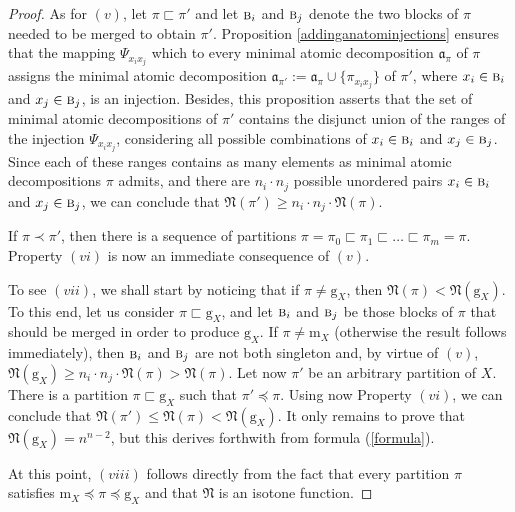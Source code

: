 \documentclass[12pt]{extarticle}
\begin{document}
\begin{proof}
		As for $(v)$, let $\pi \sqsubset \pi'$ and let $\textsc{b}_i$ and $\textsc{b}_j$ denote the two blocks of $\pi$ needed to be merged to obtain $\pi'$. Proposition \ref{addinganatominjections} ensures that the mapping $\Psi_{x_ix_j}$ which to every minimal atomic decomposition $\mathfrak{a}_{\pi}$ of $\pi$ assigns the minimal atomic decomposition $\mathfrak{a}_{\pi'}:=\mathfrak{a}_{\pi}\cup \{\pi_{x_ix_j}\}$ of $\pi'$, where $x_i\in \textsc{b}_i$ and $x_j\in \textsc{b}_j$, is an injection. Besides, this proposition asserts that the set of minimal atomic decompositions of $\pi'$ contains the disjunct union of the ranges of the injection $\Psi_{x_ix_j}$, considering all possible combinations of $x_i\in \textsc{b}_i$ and $x_j\in \textsc{b}_j$.  Since each of these ranges contains as many elements as minimal atomic decompositions $\pi$ admits, and there are $n_i\cdot n_j$ possible unordered pairs $x_i\in \textsc{b}_i$ and $x_j\in \textsc{b}_j$, we can conclude that $\mathfrak{N}(\pi') \geq n_i\cdot n_j\cdot \mathfrak{N}(\pi)$.
		
		If $\pi\prec \pi'$, then there is a sequence of partitions $\pi=\pi_0\sqsubset \pi_1 \sqsubset \ldots \sqsubset \pi_m=\pi$. Property $(vi)$ is now an immediate consequence of $(v)$.
		
		To see $(vii)$, we shall start by noticing that if $\pi\neq \textrm{g}_X$, then $\mathfrak{N}(\pi)< \mathfrak{N}(\textrm{g}_X)$. To this end, let us consider $\pi\sqsubset \textrm{g}_X$, and let $\textsc{b}_i$ and $\textsc{b}_j$ be those blocks of $\pi$ that should be merged in order to produce $\textrm{g}_X$. If $\pi\neq\textrm{m}_X$ (otherwise the result follows immediately), then $\textsc{b}_i$ and $\textsc{b}_j$ are not both singleton and, by virtue of $(v)$, $\mathfrak{N}(\textrm{g}_X)\geq n_i\cdot n_j\cdot\mathfrak{N}(\pi)>\mathfrak{N}(\pi)$. Let now $\pi'$ be an arbitrary partition of $X$. There is a partition $\pi\sqsubset\textrm{g}_X$ such that $\pi'\preceq\pi$. Using now Property $(vi)$, we can conclude that $\mathfrak{N}(\pi')\leq\mathfrak{N}(\pi)<\mathfrak{N}(\textrm{g}_X)$. It only remains to prove that $\mathfrak{N}(\textrm{g}_X)=n^{n-2}$, but this derives forthwith from formula (\ref{formula}).
		
		At this point, $(viii)$ follows directly from the fact that every partition $\pi$ satisfies $\textrm{m}_X\preceq \pi\preceq \textrm{g}_X$ and that $\mathfrak{N}$ is an isotone function.
		

\end{proof}
\end{document}
